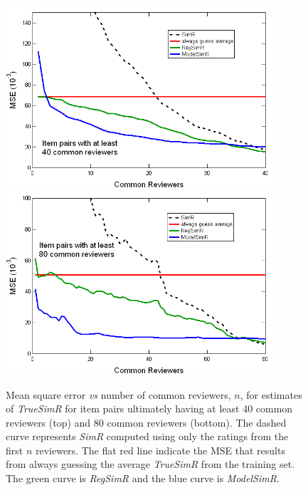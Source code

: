 \documentclass[11pt]{article}
\begin{document}
\begin{figure}[!htbp]
    \centering
    \includegraphics[width=0.9\textwidth]{MSE_SimR_40.png}
    \includegraphics[width=0.9\textwidth]{MSE_SimR_80.png}
	\caption{Mean square error {\em vs} number of common reviewers, $n$, for
estimates of {\em TrueSimR} for item pairs ultimately having at least 40 common
reviewers (top) and 80 common reviewers (bottom). The dashed curve represents
{\em SimR} computed using only the ratings from the first $n$ reviewers. The
flat red line indicate the MSE that results from always guessing the average
{\em TrueSimR} from the training set. The green curve is {\em RegSimR} and the
blue curve is {\em ModelSimR}. }
    \label{fig:MSE_SimR}
\end{figure}
\end{document}
